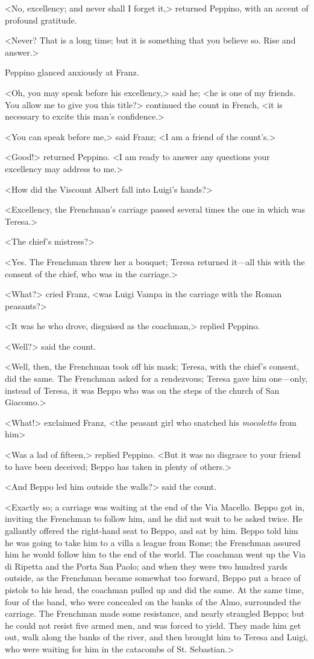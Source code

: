 <No, excellency; and never shall I forget it,> returned Peppino, with an accent of profound gratitude. 

 <Never? That is a long time; but it is something that you believe so. Rise and answer.> 

 Peppino glanced anxiously at Franz. 

 <Oh, you may speak before his excellency,> said he; <he is one of my friends. You allow me to give you this title?> continued the count in French, <it is necessary to excite this man's confidence.> 

 <You can speak before me,> said Franz; <I am a friend of the count's.> 

 <Good!> returned Peppino. <I am ready to answer any questions your excellency may address to me.> 

 <How did the Viscount Albert fall into Luigi's hands?> 

 <Excellency, the Frenchman's carriage passed several times the one in which was Teresa.> 

 <The chief's mistress?> 

 <Yes. The Frenchman threw her a bouquet; Teresa returned it—all this with the consent of the chief, who was in the carriage.> 

 <What?> cried Franz, <was Luigi Vampa in the carriage with the Roman peasants?> 

 <It was he who drove, disguised as the coachman,> replied Peppino. 

 <Well?> said the count. 

 <Well, then, the Frenchman took off his mask; Teresa, with the chief's consent, did the same. The Frenchman asked for a rendezvous; Teresa gave him one—only, instead of Teresa, it was Beppo who was on the steps of the church of San Giacomo.> 

 <What!> exclaimed Franz, <the peasant girl who snatched his \textit{mocoletto} from him\longdash> 

 <Was a lad of fifteen,> replied Peppino. <But it was no disgrace to your friend to have been deceived; Beppo has taken in plenty of others.> 

 <And Beppo led him outside the walls?> said the count. 

 <Exactly so; a carriage was waiting at the end of the Via Macello. Beppo got in, inviting the Frenchman to follow him, and he did not wait to be asked twice. He gallantly offered the right-hand seat to Beppo, and sat by him. Beppo told him he was going to take him to a villa a league from Rome; the Frenchman assured him he would follow him to the end of the world. The coachman went up the Via di Ripetta and the Porta San Paolo; and when they were two hundred yards outside, as the Frenchman became somewhat too forward, Beppo put a brace of pistols to his head, the coachman pulled up and did the same. At the same time, four of the band, who were concealed on the banks of the Almo, surrounded the carriage. The Frenchman made some resistance, and nearly strangled Beppo; but he could not resist five armed men, and was forced to yield. They made him get out, walk along the banks of the river, and then brought him to Teresa and Luigi, who were waiting for him in the catacombs of St. Sebastian.> 

